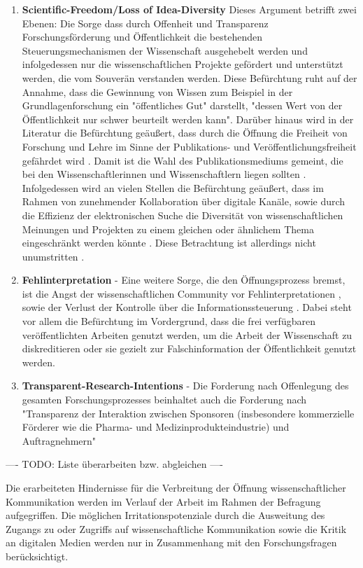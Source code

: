\begin{enumerate}
\item \textbf{Scientific-Freedom/Loss of Idea-Diversity}
Dieses Argument betrifft zwei Ebenen: Die Sorge dass durch Offenheit und Transparenz Forschungsförderung und Öffentlichkeit die bestehenden Steuerungsmechanismen der Wissenschaft ausgehebelt werden und infolgedessen nur die wissenschaftlichen Projekte gefördert und unterstützt werden, die vom Souverän verstanden werden. Diese Befürchtung ruht auf der Annahme, dass die Gewinnung von Wissen zum Beispiel in der Grundlagenforschung ein "öffentliches Gut" darstellt, "dessen Wert von der Öffentlichkeit nur schwer beurteilt werden kann"\cite{osterloh2008anreize}. Darüber hinaus wird in der Literatur die Befürchtung geäußert, dass durch die Öffnung die Freiheit von Forschung und Lehre im Sinne der Publikations- und Veröffentlichungsfreiheit gefährdet wird \cite{Jochum_2009}. Damit ist die Wahl des Publikationsmediums gemeint, die bei den Wissenschaftlerinnen und Wissenschaftlern liegen sollten \cite{bbaw_publizieren_2015} . Infolgedessen wird an vielen Stellen die Befürchtung geäußert, dass im Rahmen von zunehmender Kollaboration über digitale Kanäle, sowie durch die Effizienz der elektronischen Suche die Diversität von wissenschaftlichen Meinungen und Projekten zu einem gleichen oder ähnlichem Thema eingeschränkt werden könnte \cite{Evans_2008}. Diese Betrachtung ist allerdings nicht unumstritten \cite{lariviere2009decline}.
\item \textbf{Fehlinterpretation} - Eine weitere Sorge, die den Öffnungsprozess bremst, ist die Angst der wissenschaftlichen Community vor Fehlinterpretationen \cite{grand_2012_open}, sowie der Verlust der Kontrolle über die Informationssteuerung \cite{gibbons_1994}. Dabei steht vor allem die Befürchtung im Vordergrund, dass die frei verfügbaren veröffentlichten Arbeiten genutzt werden, um die Arbeit der Wissenschaft zu diskreditieren oder sie gezielt zur Falschinformation der Öffentlichkeit genutzt werden.
\item \textbf{Transparent-Research-Intentions} - Die Forderung nach Offenlegung des gesamten Forschungsprozesses beinhaltet auch die Forderung nach "Transparenz der Interaktion zwischen Sponsoren (insbesondere kommerzielle Förderer wie die Pharma- und Medizinprodukteindustrie) und Auftragnehmern" \cite{Stengel_2013}
\end{enumerate}

---- TODO: Liste überarbeiten  bzw. abgleichen ----

Die erarbeiteten Hindernisse für die Verbreitung der Öffnung wissenschaftlicher Kommunikation werden im Verlauf der Arbeit im Rahmen der Befragung aufgegriffen. Die möglichen Irritationspotenziale durch die Ausweitung des Zugangs zu oder Zugriffs auf wissenschaftliche Kommunikation sowie die Kritik an digitalen Medien werden nur in Zusammenhang mit den Forschungsfragen berücksichtigt.

